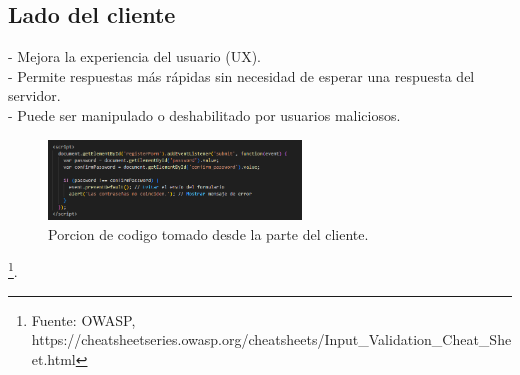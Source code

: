 \documentclass[12pt]{article}
\begin{document}
\subsection*{Lado del cliente}
- Mejora la experiencia del usuario (UX). \\
- Permite respuestas más rápidas sin necesidad de esperar una respuesta del servidor. \\
- Puede ser manipulado o deshabilitado por usuarios maliciosos.
\begin{figure}[h!]
  \centering
  \includegraphics[width=0.6\textwidth]{second.png}
  \caption{Porcion de codigo tomado desde la parte del cliente.}
  \label{fig:ejemplo}
\end{figure}
\footnote{Fuente: OWASP, https://cheatsheetseries.owasp.org/cheatsheets/Input_Validation_Cheat_Sheet.html}.
\end{document}
